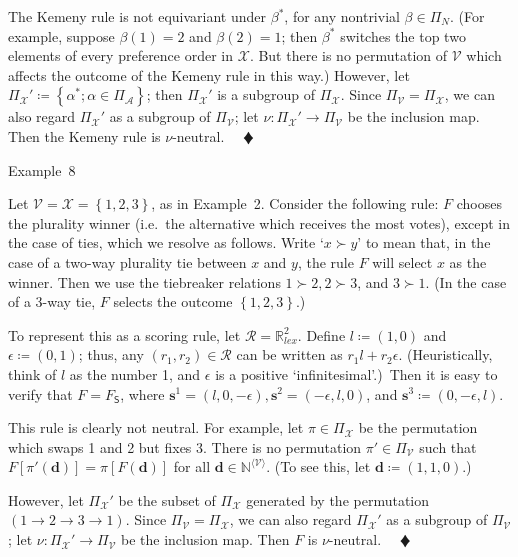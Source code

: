 \documentclass[
]{article}
\begin{document}
The Kemeny rule is not equivariant under \(\beta^{\ast}\), for any
nontrivial \(\beta \in \Pi_{N}\). (For example, suppose \(\beta(1) = 2\)
and \(\beta(2) = 1\); then \(\beta^{\ast}\) switches the top two
elements of every preference order in \(\mathcal{X}\). But there is no
permutation of \(\mathcal{V}\) which affects the outcome of the Kemeny
rule in this way.) However, let
\(\Pi_{\mathcal{X}}' ≔ \left\{ \alpha^{\ast};\alpha \in \Pi_{\mathcal{A}} \right\}\);
then \(\Pi_{\mathcal{X}}'\) is a subgroup of \(\Pi_{\mathcal{X}}\).
Since \(\Pi_{\mathcal{V}} = \Pi_{\mathcal{X}}\), we can also regard
\(\Pi_{\mathcal{X}}'\) as a subgroup of \(\Pi_{\mathcal{V}}\); let
\(\left. \nu:\Pi_{\mathcal{X}}'\longrightarrow\Pi_{\mathcal{V}} \right.\)
be the inclusion map. Then the Kemeny rule is \(\nu\)-neutral.
\(\quad ♦\)

Example~8

Let \(\mathcal{V} = \mathcal{X} = \left\{ 1,2,3 \right\}\), as in
Example~2. Consider the following rule: \(F\) chooses the plurality
winner (i.e.~the alternative which receives the most votes), except in
the case of ties, which we resolve as follows. Write `\(x \succ y\)' to
mean that, in the case of a two-way plurality tie between \(x\) and
\(y\), the rule \(F\) will select \(x\) as the winner. Then we use the
tiebreaker relations \(1 \succ 2,2 \succ 3\), and \(3 \succ 1\). (In the
case of a 3-way tie, \(F\) selects the outcome
\(\left\{ 1,2,3 \right\}\).)

To represent this as a scoring rule, let
\(\mathcal{R} = \mathbb{R}_{lex}^{2}\). Define \(l ≔ (1,0)\) and
\(\epsilon ≔ (0,1)\); thus, any
\(\left( r_{1},r_{2} \right) \in \mathcal{R}\) can be written as
\(r_{1}l + r_{2}\epsilon\). (Heuristically, think of \(l\) as the number
1, and \(\epsilon\) is a positive `infinitesimal'.)~Then it is easy to
verify that \(F = F_{\mathsf{S}}\), where
\(\mathbf{s}^{1} = (l,0, - \epsilon),\mathbf{s}^{2} = ( - \epsilon,l,0)\),
and \(\mathbf{s}^{3} ≔ (0, - \epsilon,l)\).

This rule is clearly not neutral. For example, let
\(\pi \in \Pi_{\mathcal{X}}\) be the permutation which swaps 1 and 2 but
fixes 3. There is no permutation \(\pi' \in \Pi_{\mathcal{V}}\) such
that
\(F\left\lbrack \pi'\left( \mathbf{d} \right) \right\rbrack = \pi\left\lbrack F\left( \mathbf{d} \right) \right\rbrack\)
for all \(\mathbf{d} \in \mathbb{N}^{\langle\mathcal{V}\rangle}\). (To
see this, let \(\mathbf{d} ≔ (1,1,0)\).)

However, let \(\Pi_{\mathcal{X}}'\) be the subset of
\(\Pi_{\mathcal{X}}\) generated by the permutation
\(\left( 1\rightarrow 2\rightarrow 3\rightarrow 1 \right)\). Since
\(\Pi_{\mathcal{V}} = \Pi_{\mathcal{X}}\), we can also regard
\(\Pi_{\mathcal{X}}'\) as a subgroup of \(\Pi_{\mathcal{V}}\); let
\(\left. \nu:\Pi_{\mathcal{X}}'\longrightarrow\Pi_{\mathcal{V}} \right.\)
be the inclusion map. Then \(F\) is \(\nu\)-neutral. \(\quad ♦\)
\end{document}
